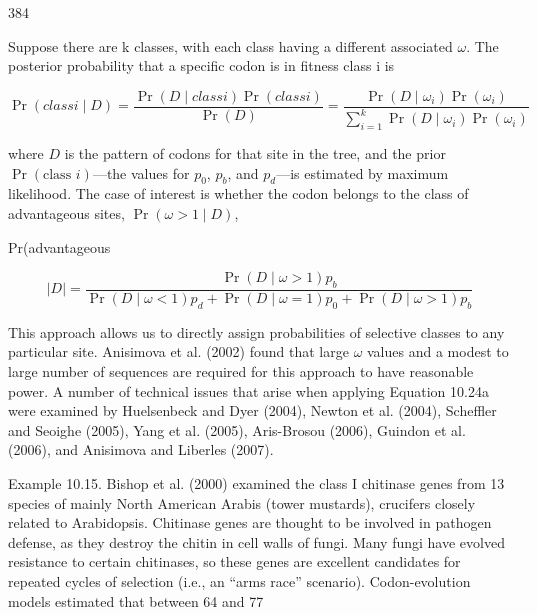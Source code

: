 \documentclass{article}
\begin{document}
384

Suppose there are k classes, with each class having a different associated  $ \omega $. The posterior probability that a specific codon is in fitness class i is

\begin{equation}
\Pr(class i\mid D)=\frac{\Pr(D\mid class i)\Pr(class i)}{\Pr(D)}=\frac{\Pr(D\mid\omega_{i})\Pr(\omega_{i})}{\sum_{i=1}^{k}\Pr(D\mid\omega_{i})\Pr(\omega_{i})}
\tag{10.24a}
\label{eq:10_24a}
\end{equation}

where $D$ is the pattern of codons for that site in the tree, and the prior $\operatorname{Pr}(\text{class } i)$—the values for $p_0$, $p_b$, and $p_d$—is estimated by maximum likelihood. The case of interest is whether the codon belongs to the class of advantageous sites, $\operatorname{Pr}(\omega > 1 \mid D)$,

Pr(advantageous

\begin{equation}
\left|D\right|=\frac{\Pr(D\mid\omega>1)p_{b}}{\Pr(D\mid\omega<1)p_{d}+\Pr(D\mid\omega=1)p_{0}+\Pr(D\mid\omega>1)p_{b}}
\tag{10.24b}
\label{eq:10_24b}
\end{equation}

This approach allows us to directly assign probabilities of selective classes to any particular site. Anisimova et al. (2002) found that large  $ \omega $ values and a modest to large number of sequences are required for this approach to have reasonable power. A number of technical issues that arise when applying Equation 10.24a were examined by Huelsenbeck and Dyer (2004), Newton et al. (2004), Scheffler and Seoighe (2005), Yang et al. (2005), Aris-Brosou (2006), Guindon et al. (2006), and Anisimova and Liberles (2007).

Example 10.15. Bishop et al. (2000) examined the class I chitinase genes from 13 species of mainly North American Arabis (tower mustards), crucifers closely related to Arabidopsis. Chitinase genes are thought to be involved in pathogen defense, as they destroy the chitin in cell walls of fungi. Many fungi have evolved resistance to certain chitinases, so these genes are excellent candidates for repeated cycles of selection (i.e., an “arms race” scenario). Codon-evolution models estimated that between 64 and 77%
\end{document}
